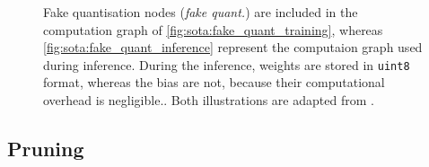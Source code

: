 \begin{figure}[htbp]
\centering
{}
\caption{Fake quantisation nodes (\emph{fake quant.}) are included in the
computation graph of \cref{fig:sota:fake_quant_training}, whereas
\cref{fig:sota:fake_quant_inference} represent the computaion graph used during
inference. During the inference, weights are stored in \texttt{uint8} format,
whereas the bias are not, because their computational overhead is
negligible.\cite{DBLP:conf/cvpr/JacobKCZTHAK18}. Both illustrations are adapted
from \cite{DBLP:conf/cvpr/JacobKCZTHAK18}.}
\label{fig:sota:fake_quant}
\end{figure}

\subsection{Pruning}\label{sec:sota:pruning}

